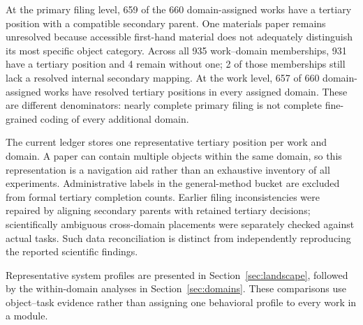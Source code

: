 At the primary filing level, 659 of the 660 domain-assigned works have a tertiary position with a compatible secondary parent. One materials paper remains unresolved because accessible first-hand material does not adequately distinguish its most specific object category. Across all 935 work--domain memberships, 931 have a tertiary position and 4 remain without one; 2 of those memberships still lack a resolved internal secondary mapping. At the work level, 657 of 660 domain-assigned works have resolved tertiary positions in every assigned domain. These are different denominators: nearly complete primary filing is not complete fine-grained coding of every additional domain.

The current ledger stores one representative tertiary position per work and domain. A paper can contain multiple objects within the same domain, so this representation is a navigation aid rather than an exhaustive inventory of all experiments. Administrative labels in the general-method bucket are excluded from formal tertiary completion counts. Earlier filing inconsistencies were repaired by aligning secondary parents with retained tertiary decisions; scientifically ambiguous cross-domain placements were separately checked against actual tasks. Such data reconciliation is distinct from independently reproducing the reported scientific findings.

Representative system profiles are presented in Section~\ref{sec:landscape}, followed by the within-domain analyses in Section~\ref{sec:domains}. These comparisons use object--task evidence rather than assigning one behavioral profile to every work in a module.
